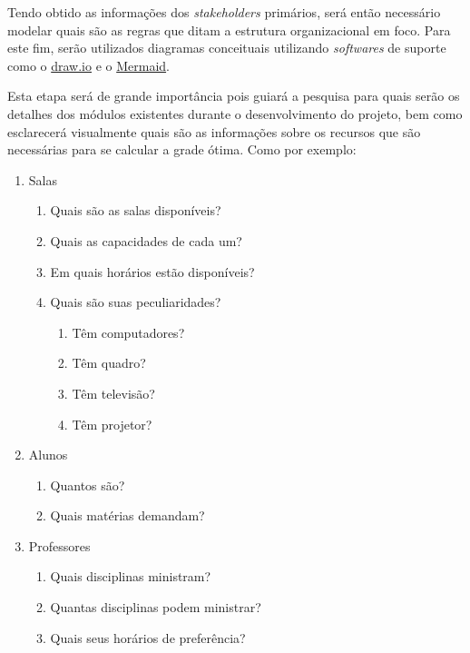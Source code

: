 Tendo obtido as informações dos \textit{stakeholders} primários, será então necessário modelar quais são as regras que ditam a estrutura organizacional em foco. Para este fim, serão utilizados diagramas conceituais utilizando \textit{softwares} de suporte como o \href{\LinkDrawio}{draw.io} e o \href{\LinkMermaid}{Mermaid}.


Esta etapa será de grande importância pois guiará a pesquisa para quais serão os detalhes dos módulos existentes durante o desenvolvimento do projeto, bem como esclarecerá visualmente quais são as informações sobre os recursos que são necessárias para se calcular a grade ótima. Como por exemplo:

\begin{enumerate}
  \item Salas
        \begin{enumerate}
          \item Quais são as salas disponíveis?
          \item Quais as capacidades de cada um?
          \item Em quais horários estão disponíveis?
          \item Quais são suas peculiaridades?
                \begin{enumerate}
                  \item Têm computadores?
                  \item Têm quadro?
                  \item Têm televisão?
                  \item Têm projetor?
                \end{enumerate}
        \end{enumerate}
  \item Alunos
        \begin{enumerate}
          \item Quantos são?
          \item Quais matérias demandam?
        \end{enumerate}
  \item Professores
        \begin{enumerate}
          \item Quais disciplinas ministram?
          \item Quantas disciplinas podem ministrar?
          \item Quais seus horários de preferência?
        \end{enumerate}
\end{enumerate}

